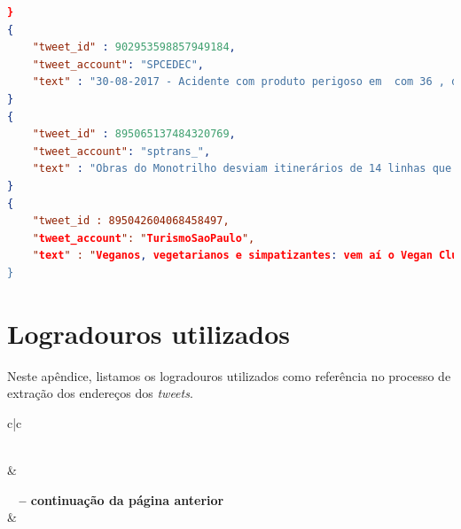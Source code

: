 \documentclass[
	12pt,				%
	oneside,			%
	a4paper,			%
	english,			%
	brazil				%
	]{abntex2ppgsi}
\begin{document}
{{{\begin{apendicesenv}
\begin{lstlisting}[language=json,title=Exemplos de \textit{tweets} dos perfis selecionados citados na Tabela~\ref{tab:oficialProfiles}, label=tweetsSample]
}
{
    "tweet_id" : 902953598857949184,
    "tweet_account": "SPCEDEC",
    "text" : "30-08-2017 - Acidente com produto perigoso em  com 36 , deixa 21 vítimas feridas e 02 ."
}
{
    "tweet_id" : 895065137484320769,
    "tweet_account": "sptrans_",
    "text" : "Obras do Monotrilho desviam itinerários de 14 linhas que atendem a Av. Sapopemba entre 5 e 11/08, das 23h às 5h: https://t.co/jH4LFgrSKZ"
}
{
    "tweet_id : 895042604068458497,
    "tweet_account": "TurismoSaoPaulo",
    "text" : "Veganos, vegetarianos e simpatizantes: vem aí o Vegan Club, em 12/08, no Centro de SP! #crueltyfree #veganfood... https://t.co/7f7ggr4vn4"
}
\end{lstlisting}

\clearpage

\chapter{Logradouros utilizados}
\label{apendiceB}

Neste apêndice, listamos os logradouros utilizados como referência no processo de extração dos endereços dos \textit{tweets}.

\begin{longtable}{c|c}
\caption{Tabela de logradouros com abreviaturas}
\label{tab:logradouros}\\

\hline {} &  \\ \hline 
\endfirsthead

%
{{\bfseries \tablename\ \thetable{} -- continuação da página anterior}} \\
\hline {} &   \\ \hline 
\endhead

\hline {} \\
\endfoot

\hline \hline
\endlastfoot


\end{longtable}
\end{apendicesenv}}}}
\end{document}
